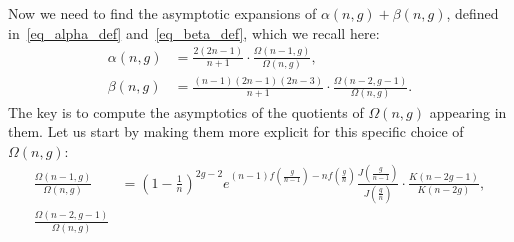 \documentclass[a4paper,12pt]{article}
\theoremstyle{definition}
\begin{document}
Now we need to find the asymptotic expansions of $\alpha(n,g) + \beta(n,g)$, defined in~\eqref{eq_alpha_def} and~\eqref{eq_beta_def}, which we recall here:
\begin{align*}
        \alpha(n,g) &= \frac{2(2n-1)}{n+1} \cdot \frac{\Omega(n-1,g)}{\Omega(n,g)},\\
    \beta(n,g) &= \frac{(n-1)(2n-1)(2n-3)}{n+1} \cdot \frac{\Omega(n-2,g-1)}{\Omega(n,g)}.
\end{align*}
The key is to compute the asymptotics of the quotients of $\Omega(n,g)$ appearing in them. 
Let us start by making them more explicit for this specific choice of $\Omega(n,g)$:
\begin{align}
    \frac{\Omega(n-1,g)}{\Omega(n,g)}
        &= \left(1-\frac{1}{n}\right)^{2g-2} e^{(n-1)f(\frac{g}{n-1})-nf(\frac{g}{n})} \frac{{J}\left(\frac{g}{n-1}\right)}{{J}\left(\frac{g}{n}\right)} \cdot \frac{K(n-2g-1)}{ K(n-2g)} , \label{eq:Omega_alpha_quot}\\
    \frac{\Omega(n-2,g-1)}{\Omega(n,g)} 

\end{align}
\end{document}

